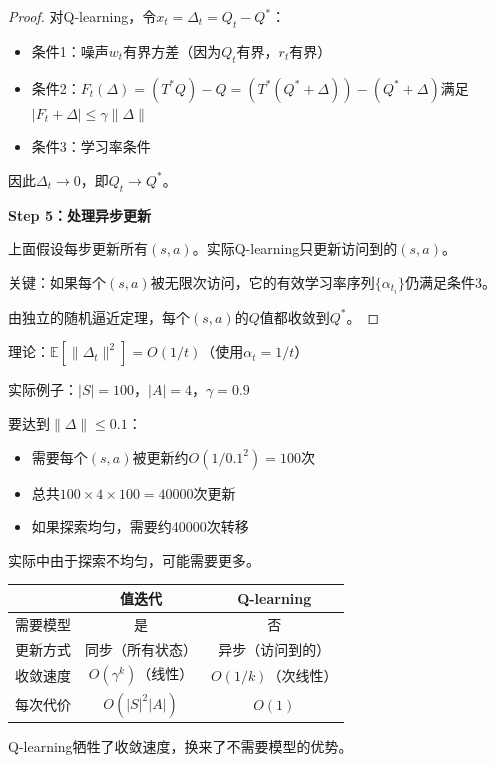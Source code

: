 \documentclass[11pt,a4paper]{article}
\theoremstyle{definition}
\begin{document}
\begin{proof}
对Q-learning，令$x_t = \Delta_t = Q_t - Q^*$：

\begin{itemize}
    \item 条件1：噪声$w_t$有界方差（因为$Q_t$有界，$r_t$有界）\checkmark
    \item 条件2：$F_t(\Delta) = (T^* Q) - Q = (T^*(Q^* + \Delta)) - (Q^* + \Delta)$满足$|F_t + \Delta| \leq \gamma\|\Delta\|$ \checkmark
    \item 条件3：学习率条件 \checkmark
\end{itemize}

因此$\Delta_t \to 0$，即$Q_t \to Q^*$。

\textbf{Step 5：处理异步更新}

上面假设每步更新所有$(s,a)$。实际Q-learning只更新访问到的$(s,a)$。

关键：如果每个$(s,a)$被无限次访问，它的有效学习率序列$\{\alpha_{t_i}\}$仍满足条件3。

由独立的随机逼近定理，每个$(s,a)$的$Q$值都收敛到$Q^*$。
\end{proof}

\begin{calculation}[Q-learning收敛速度]
理论：$\mathbb{E}[\|\Delta_t\|^2] = O(1/t)$（使用$\alpha_t = 1/t$）

实际例子：$|S|=100$，$|A|=4$，$\gamma=0.9$

要达到$\|\Delta\| \leq 0.1$：
\begin{itemize}
    \item 需要每个$(s,a)$被更新约$O(1/0.1^2) = 100$次
    \item 总共$100 \times 4 \times 100 = 40000$次更新
    \item 如果探索均匀，需要约40000次转移
\end{itemize}

实际中由于探索不均匀，可能需要更多。
\end{calculation}

\begin{keypoint}
\begin{center}
\begin{tabular}{l|c|c}
\toprule
& 值迭代 & Q-learning \\
\midrule
需要模型 & 是 & 否 \\
更新方式 & 同步（所有状态） & 异步（访问到的） \\
收敛速度 & $O(\gamma^k)$（线性） & $O(1/k)$（次线性） \\
每次代价 & $O(|S|^2|A|)$ & $O(1)$ \\
\bottomrule
\end{tabular}
\end{center}

Q-learning牺牲了收敛速度，换来了不需要模型的优势。
\end{keypoint}
\end{document}
